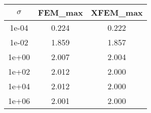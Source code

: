 \documentclass[10pt]{report}
\begin{document}
\begin{table}[H]
\begin{center}
\begin{tabular}{|c|c|c|} \hline
$\sigma$ & FEM_max & XFEM_max\\ \hline
1e-04 & 0.224 & 0.222\\ \hline
1e-02 & 1.859 & 1.857\\ \hline
1e+00 & 2.007 & 2.004\\ \hline
1e+02 & 2.012 & 2.000\\ \hline
1e+04 & 2.012 & 2.000\\ \hline
1e+06 & 2.001 & 2.000\\ \hline
\end{tabular}
\end{center}
\end{table}
\end{document}
